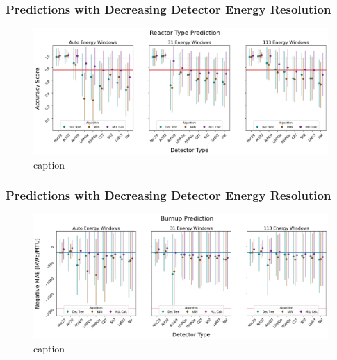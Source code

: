 \begin{frame}
  \frametitle{Predictions with Decreasing Detector Energy Resolution}
  \begin{adjustwidth}{-25pt}{0pt}
  \begin{figure}
    \centering
    \includegraphics[width=1.15\textwidth]{./figures/detector_preds_wrt_enlist_reactor.png}
    \caption{caption}
  \end{figure}
  \end{adjustwidth}
\end{frame}

\begin{frame}
  \frametitle{Predictions with Decreasing Detector Energy Resolution}
  \begin{adjustwidth}{-25pt}{0pt}
  \begin{figure}
    \centering
    \includegraphics[width=1.15\textwidth]{./figures/detector_preds_wrt_enlist_burnup.png}
    \caption{caption}
  \end{figure}
  \end{adjustwidth}
\end{frame}

